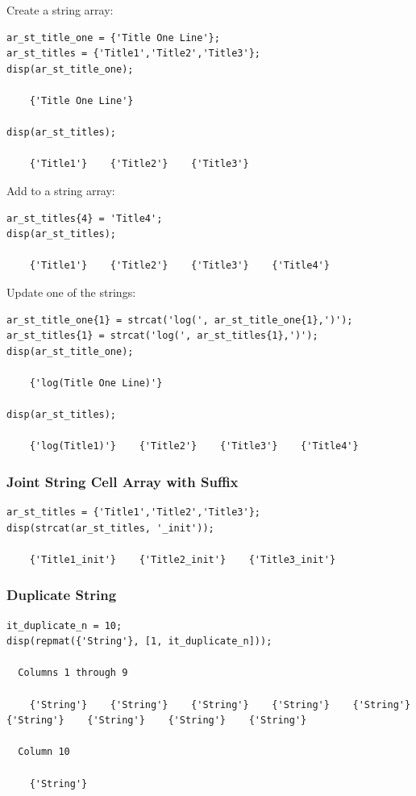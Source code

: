 \documentclass[
]{book}
\begin{document}
Create a string array:

\begin{verbatim}
ar_st_title_one = {'Title One Line'};
ar_st_titles = {'Title1','Title2','Title3'};
disp(ar_st_title_one);

    {'Title One Line'}

disp(ar_st_titles);

    {'Title1'}    {'Title2'}    {'Title3'}
\end{verbatim}

Add to a string array:

\begin{verbatim}
ar_st_titles{4} = 'Title4';
disp(ar_st_titles);

    {'Title1'}    {'Title2'}    {'Title3'}    {'Title4'}
\end{verbatim}

Update one of the strings:

\begin{verbatim}
ar_st_title_one{1} = strcat('log(', ar_st_title_one{1},')');
ar_st_titles{1} = strcat('log(', ar_st_titles{1},')');
disp(ar_st_title_one);

    {'log(Title One Line)'}

disp(ar_st_titles);

    {'log(Title1)'}    {'Title2'}    {'Title3'}    {'Title4'}
\end{verbatim}

\hypertarget{joint-string-cell-array-with-suffix}{%
\subsubsection{Joint String Cell Array with Suffix}\label{joint-string-cell-array-with-suffix}}

\begin{verbatim}
ar_st_titles = {'Title1','Title2','Title3'};
disp(strcat(ar_st_titles, '_init'));

    {'Title1_init'}    {'Title2_init'}    {'Title3_init'}
\end{verbatim}

\hypertarget{duplicate-string}{%
\subsubsection{Duplicate String}\label{duplicate-string}}

\begin{verbatim}
it_duplicate_n = 10;
disp(repmat({'String'}, [1, it_duplicate_n]));

  Columns 1 through 9

    {'String'}    {'String'}    {'String'}    {'String'}    {'String'}    {'String'}    {'String'}    {'String'}    {'String'}

  Column 10

    {'String'}
\end{verbatim}
\end{document}

